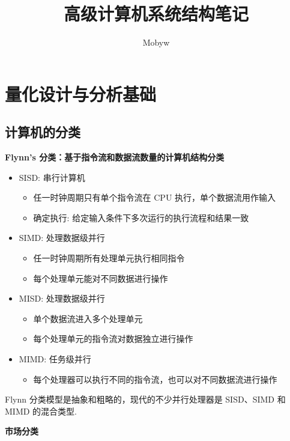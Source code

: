 \documentclass[cn, hazy, blue, normal, 12pt]{elegantnote}
\title{高级计算机系统结构笔记}
\author{Mobyw}
\institute{Created by Elegant\LaTeX{}}
\date{\zhtoday}
\begin{document}
\maketitle

\section{量化设计与分析基础}

\subsection{计算机的分类}

\textbf{Flynn's 分类：基于指令流和数据流数量的计算机结构分类}

\begin{itemize}
    \item SISD: 串行计算机
          \begin{itemize}
              \item 任一时钟周期只有单个指令流在 CPU 执行，单个数据流用作输入
              \item 确定执行: 给定输入条件下多次运行的执行流程和结果一致
          \end{itemize}
    \item SIMD: 处理数据级并行
          \begin{itemize}
              \item 任一时钟周期所有处理单元执行相同指令
              \item 每个处理单元能对不同数据进行操作
          \end{itemize}
    \item MISD: 处理数据级并行
          \begin{itemize}
              \item 单个数据流进入多个处理单元
              \item 每个处理单元的指令流对数据独立进行操作
          \end{itemize}
    \item MIMD: 任务级并行
          \begin{itemize}
              \item 每个处理器可以执行不同的指令流，也可以对不同数据流进行操作
          \end{itemize}
\end{itemize}

Flynn 分类模型是抽象和粗略的，现代的不少并行处理器是 SISD、SIMD 和 MIMD 的混合类型.

\textbf{市场分类}
\end{document}
